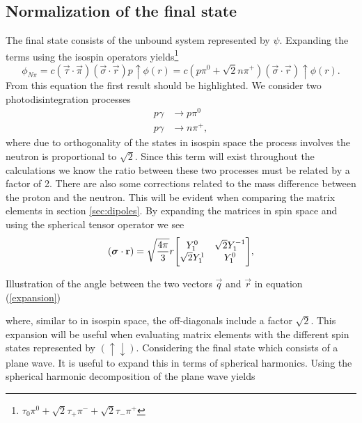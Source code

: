 \subsection{Normalization of the final state}\label{subsec:final}
The final state consists of the unbound system represented by $\psi$. Expanding the terms using the isospin operators yields\footnote{$\tau_0 \pi^0 + \sqrt{2}\tau_+\pi^-+\sqrt{2}\tau_-\pi^+$}
\begin{equation} \label{phiinitial}
    \phi_{N\pi} = c(\vec{\tau}\cdot \vec{\pi})(\vec{\sigma}\cdot \vec{r})p\uparrow \phi(r) = c(p\pi^0+\sqrt{2}n\pi^+)(\vec{\sigma}\cdot \vec{r})\uparrow \phi(r).
\end{equation}
From this equation the first result should be highlighted. We consider two photodisintegration processes
\begin{align}
     p\gamma & \rightarrow p\pi^0 \\
     p\gamma & \rightarrow n \pi^+,
\end{align}
where due to orthogonality of the states in isospin space the process involves the neutron is proportional to $\sqrt{2}$. Since this term will exist throughout the calculations we know the ratio between these two processes must be related by a factor of 2. There are also some corrections related to the mass difference between the proton and the neutron. This will be evident when comparing the matrix elements in section \ref{sec:dipoles}. By expanding the matrices in spin space and using the spherical tensor operator we see
\begin{equation}\label{spinmatrix}
    (\vec{\sigma}\cdot \vec{r}) = \sqrt{\frac{4\pi}{3}} r \mqty[Y_{1}^0 & \sqrt{2}Y_1^{-1} \\ \sqrt{2}Y_1^1 & Y_1^0],
\end{equation}
\begin{marginfigure}
\centering

\caption{Illustration of the angle between the two vectors $\vec{q}$ and $\vec{r}$ in equation (\ref{expansion})}
\label{normsphere}
\end{marginfigure}
where, similar to in isospin space, the off-diagonals include a factor $\sqrt{2}$. This expansion will be useful when evaluating matrix elements with the different spin states represented by $(\uparrow \downarrow)$. Considering the final state which consists of a plane wave. It is useful to expand this in terms of spherical harmonics. Using the spherical harmonic decomposition of the plane wave yields

